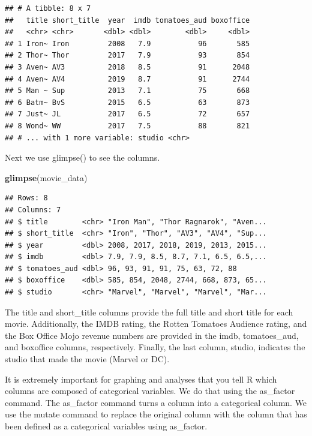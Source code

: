 \documentclass[
]{krantz}
\makeatletter
\newenvironment{Shaded}{\begin{snugshade}}{\end{snugshade}}
\newcommand{\KeywordTok}[1]{\textcolor[rgb]{0.27,0.27,0.27}{\textbf{#1}}}
\newcommand{\NormalTok}[1]{#1}
\newenvironment{kframe}{%
\medskip{}
\setlength{\fboxsep}{.8em}
 \def\at@end@of@kframe{}%
 \ifinner\ifhmode%
  \def\at@end@of@kframe{\end{minipage}}%
  \begin{minipage}{\columnwidth}%
 \fi\fi%
 \def\FrameCommand##1{\hskip\@totalleftmargin \hskip-\fboxsep
 \colorbox{shadecolor}{##1}\hskip-\fboxsep
     \hskip-\linewidth \hskip-\@totalleftmargin \hskip\columnwidth}%
 \MakeFramed {\advance\hsize-\width
   \@totalleftmargin\z@ \linewidth\hsize
   \@setminipage}}%
 {\par\unskip\endMakeFramed%
 \at@end@of@kframe}
\renewenvironment{Shaded}{\begin{kframe}}{\end{kframe}}
\makeatother
\begin{document}
\begin{verbatim}
## # A tibble: 8 x 7
##   title short_title  year  imdb tomatoes_aud boxoffice
##   <chr> <chr>       <dbl> <dbl>        <dbl>     <dbl>
## 1 Iron~ Iron         2008   7.9           96       585
## 2 Thor~ Thor         2017   7.9           93       854
## 3 Aven~ AV3          2018   8.5           91      2048
## 4 Aven~ AV4          2019   8.7           91      2744
## 5 Man ~ Sup          2013   7.1           75       668
## 6 Batm~ BvS          2015   6.5           63       873
## 7 Just~ JL           2017   6.5           72       657
## 8 Wond~ WW           2017   7.5           88       821
## # ... with 1 more variable: studio <chr>
\end{verbatim}

Next we use glimpse() to see the columns.

\begin{Shaded}
\begin{Highlighting}[]
\KeywordTok{glimpse}\NormalTok{(movie_data)}
\end{Highlighting}
\end{Shaded}

\begin{verbatim}
## Rows: 8
## Columns: 7
## $ title        <chr> "Iron Man", "Thor Ragnarok", "Aven...
## $ short_title  <chr> "Iron", "Thor", "AV3", "AV4", "Sup...
## $ year         <dbl> 2008, 2017, 2018, 2019, 2013, 2015...
## $ imdb         <dbl> 7.9, 7.9, 8.5, 8.7, 7.1, 6.5, 6.5,...
## $ tomatoes_aud <dbl> 96, 93, 91, 91, 75, 63, 72, 88
## $ boxoffice    <dbl> 585, 854, 2048, 2744, 668, 873, 65...
## $ studio       <chr> "Marvel", "Marvel", "Marvel", "Mar...
\end{verbatim}

The title and short\_title columns provide the full title and short title for each movie. Additionally, the IMDB rating, the Rotten Tomatoes Audience rating, and the Box Office Mojo revenue numbers are provided in the imdb, tomatoes\_aud, and boxoffice columns, respectively. Finally, the last column, studio, indicates the studio that made the movie (Marvel or DC).

It is extremely important for graphing and analyses that you tell R which columns are composed of categorical variables. We do that using the as\_factor command. The as\_factor command turns a column into a categorical column. We use the mutate command to replace the original column with the column that has been defined as a categorical variables using as\_factor.
\end{document}
